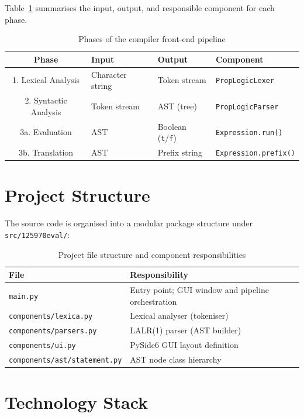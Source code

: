 Table~\ref{table:pipeline_phases} summarises the input, output, and responsible component for each phase.

\begin{table}[H]
\centering
\caption{Phases of the compiler front-end pipeline}
\label{table:pipeline_phases}
\begin{tabular}{@{}clll@{}}
\toprule
Phase & Input & Output & Component \\
\midrule
1. Lexical Analysis   & Character string & Token stream       & \texttt{PropLogicLexer} \\
2. Syntactic Analysis & Token stream     & AST (tree)         & \texttt{PropLogicParser} \\
3a. Evaluation        & AST              & Boolean (\texttt{t}/\texttt{f}) & \texttt{Expression.run()} \\
3b. Translation       & AST              & Prefix string      & \texttt{Expression.prefix()} \\
\bottomrule
\end{tabular}
\end{table}

\section{Project Structure}

The source code is organised into a modular package structure under \texttt{src/125970eval/}:

\begin{table}[H]
\centering
\caption{Project file structure and component responsibilities}
\label{table:project_structure}
\begin{tabular}{@{}ll@{}}
\toprule
File & Responsibility \\
\midrule
\texttt{main.py}                      & Entry point; GUI window and pipeline orchestration \\
\texttt{components/lexica.py}          & Lexical analyser (tokeniser) \\
\texttt{components/parsers.py}         & LALR(1) parser (AST builder) \\
\texttt{components/ui.py}              & PySide6 GUI layout definition \\
\texttt{components/ast/statement.py}   & AST node class hierarchy \\
\bottomrule
\end{tabular}
\end{table}

\section{Technology Stack}


